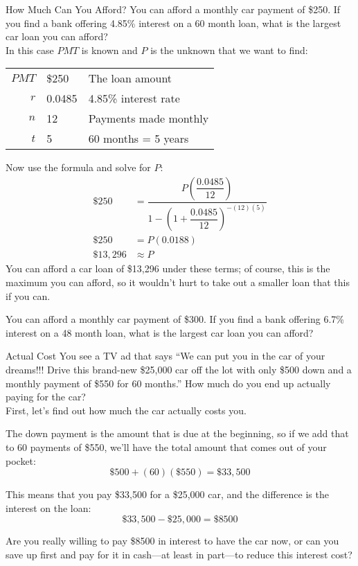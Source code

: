 \begin{example}[https://www.youtube.com/watch?v=ydmN5lt5g20]{How Much Can You Afford?}
You can afford a monthly car payment of \$250.  If you find a bank offering 4.85\% interest on a 60 month loan, what is the largest car loan you can afford?\\

\sol
In this case $PMT$ is known and $P$ is the unknown that we want to find:
\begin{center}
\begin{tabular}{r l l}
$PMT$ & \$250 & The loan amount\\
$r$ & 0.0485 & 4.85\% interest rate\\
$n$ & 12 & Payments made monthly\\
$t$ & 5 & 60 months = 5 years
\end{tabular}
\end{center}

Now use the formula and solve for $P$:
\begin{align*}
\$250 &= \dfrac{P\left(\dfrac{0.0485}{12}\right)}{1-\left(1+\dfrac{0.0485}{12}\right)^{-(12)(5)}}\\
\$250 &= P(0.0188)\\
\boxed{\$13,296} &\approx P
\end{align*}
You can afford a car loan of \$13,296 under these terms; of course, this is the maximum you can afford, so it wouldn't hurt to take out a smaller loan that this if you can.
\end{example}

\begin{try}
You can afford a monthly car payment of \$300.  If you find a bank offering 6.7\% interest on a 48 month loan, what is the largest car loan you can afford?
\end{try}

\begin{example}[https://www.youtube.com/watch?v=rhTeMJm8-Lc]{Actual Cost}
You see a TV ad that says ``We can put you in the car of your dreams!!! Drive this brand-new \$25,000 car off the lot with only \$500 down and a monthly payment of \$550 for 60 months.''  How much do you end up actually paying for the car?\\

\solline
{}
First, let's find out how much the car actually costs you.

The down payment is the amount that is due at the beginning, so if we add that to 60 payments of \$550, we'll have the total amount that comes out of your pocket:
\[\$500 + (60)(\$550) = \$33,500\]

This means that you pay \$33,500 for a \$25,000 car, and the difference is the interest on the loan:\marginnote{\footnotesize\textcolor{black!60}{Photo by Christopher Ziemnowicz}}
\[\$33,500 - \$25,000 = \boxed{\$8500}\]

Are you really willing to pay \$8500 in interest to have the car now, or can you save up first and pay for it in cash---at least in part---to reduce this interest cost?
\end{example}

